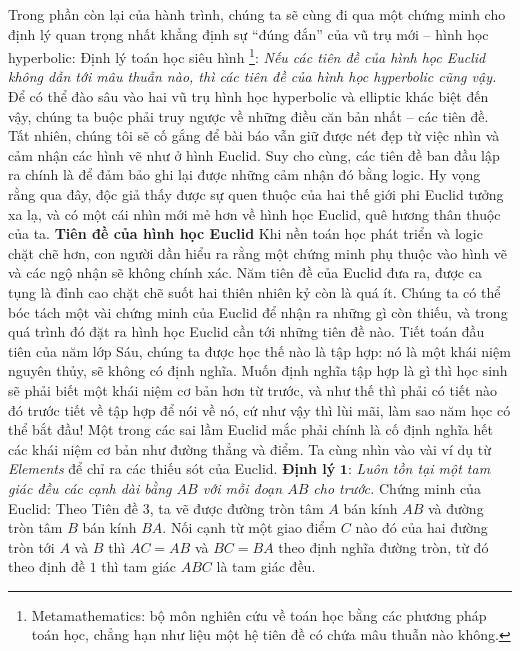 \begin{multicols}{2}
	Trong phần còn lại của hành trình, chúng ta sẽ cùng đi qua một chứng minh cho định lý quan trọng nhất khẳng định sự ``đúng đắn'' của vũ trụ mới -- hình học hyperbolic:
	\vskip 0.1cm
	Định lý toán học siêu hình
	\footnote[2]{\color{lichsutoanhoc}Metamathematics: bộ môn nghiên cứu về toán học bằng các phương pháp toán học, chẳng hạn như liệu một hệ tiên đề có chứa mâu thuẫn nào không.}: \textit{Nếu các tiên đề của hình học Euclid không dẫn tới mâu thuẫn nào, thì các tiên đề của hình học hyperbolic cũng vậy. }
	\vskip 0.1cm
	Để có thể đào sâu vào hai vũ trụ hình học hyperbolic và elliptic khác biệt đến vậy, chúng ta buộc phải truy ngược về những điều căn bản nhất -- các tiên đề. Tất nhiên, chúng tôi sẽ cố gắng để bài báo vẫn giữ được nét đẹp từ việc nhìn và cảm nhận các hình vẽ như ở hình Euclid. Suy cho cùng, các tiên đề ban đầu lập ra chính là để đảm bảo ghi lại được những cảm nhận đó bằng logic. 
	\vskip 0.1cm
	Hy vọng rằng qua đây, độc giả thấy được sự quen thuộc của hai thế giới phi Euclid tưởng xa lạ, và có một cái nhìn mới mẻ hơn về hình học Euclid, quê hương thân thuộc của ta.
	\vskip 0.1cm
	\textbf{\color{lichsutoanhoc}Tiên đề của hình học Euclid}
	\vskip 0.1cm
	Khi nền toán học phát triển và logic chặt chẽ hơn, con người dần hiểu ra rằng một chứng minh phụ thuộc vào hình vẽ và các ngộ nhận sẽ không chính xác. Năm tiên đề của Euclid đưa ra, được ca tụng là đỉnh cao chặt chẽ suốt hai thiên nhiên kỷ còn là quá ít. Chúng ta có thể bóc tách một vài chứng minh của Euclid để nhận ra những gì còn thiếu, và trong quá trình đó đặt ra hình học Euclid cần tới những tiên đề nào. 
	\vskip 0.1cm
	Tiết toán đầu tiên của năm lớp Sáu, chúng ta  được học thế nào là tập hợp: nó là một khái niệm nguyên thủy, sẽ không có định nghĩa. Muốn định nghĩa tập hợp là gì thì học sinh sẽ phải biết một khái niệm cơ bản hơn từ trước, và như thế thì phải có tiết nào đó trước tiết về tập hợp để nói về nó, cứ như vậy thì lùi mãi, làm sao năm học có thể bắt đầu! Một trong các sai lầm Euclid mắc phải chính là cố định nghĩa hết các khái niệm cơ bản như đường thẳng và điểm.
	\vskip 0.1cm
	Ta cùng nhìn vào vài ví dụ từ \textit{Elements} để chỉ ra các thiếu sót của Euclid. 
	\vskip 0.1cm
	\textbf{\color{lichsutoanhoc}Định lý} $\pmb{1}$: \textit{Luôn tồn tại một tam giác đều các cạnh dài bằng $AB$ với mỗi đoạn $AB$ cho trước.} 
	\vskip 0.1cm
	Chứng minh của Euclid: Theo Tiên đề $3$, ta vẽ được đường tròn tâm $A$ bán kính $AB$ và đường tròn tâm $B$ bán kính $BA$. Nối cạnh từ một giao điểm $C$ nào đó của hai đường tròn tới $A$ và $B$ thì $AC = AB$ và $BC = BA$ theo định nghĩa đường tròn, từ đó theo định đề $1$ thì tam giác $ABC$ là tam giác đều.

\end{multicols}
